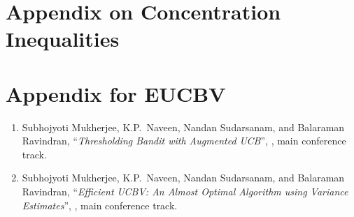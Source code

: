 \documentclass[MS]{iitmdiss}
\begin{document}
\chapter{Appendix on Concentration Inequalities}
\label{sec:app:Conc}



\chapter{Appendix for EUCBV}
\label{sec:app:EUCBV}



\begin{singlespace}


\end{singlespace}



\listofpapers


\begin{enumerate}
\item Subhojyoti Mukherjee, K.P.~Naveen, Nandan Sudarsanam, and Balaraman Ravindran, ``\textit{Thresholding Bandit with Augmented UCB}'', , main conference track.
\item Subhojyoti Mukherjee, K.P.~Naveen, Nandan Sudarsanam, and Balaraman Ravindran, ``\textit{Efficient UCBV: An Almost Optimal Algorithm using Variance Estimates}'', , main conference track.
\end{enumerate}
\end{document}
